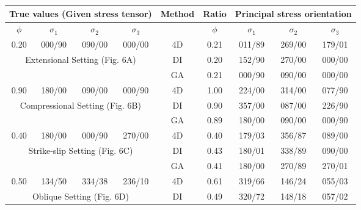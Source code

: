 \pagebreak
\begin{table}[H]
  \footnotesize
  \centering
  \renewcommand{\arraystretch}{1.5}
  \begin{tabular}{@{}ccccccccc@{}}
    \toprule
    \multicolumn{4}{c}{True values (Given stress tensor)} & Method & Ratio & \multicolumn{3}{c}{Principal stress orientation} \\
    
    \midrule
    
    $\phi$ & $\sigma_1$ & $\sigma_2$ & $\sigma_3$ & & $\phi$ & $\sigma_1$ & $\sigma_2$ & $\sigma_3$ \\
    
    \cmidrule(lr){1-4} \cmidrule(lr){6-9}
  
    0.20 & 000/90 & 090/00 & 000/00 & 4D & 0.21 & 011/89 & 269/00 & 179/01 \\
    
    \multicolumn{4}{c}{Extensional Setting (Fig. 6A)} & DI & 0.20 & 152/90 & 270/00 & 000/00 \\
    
    \multicolumn{4}{c}{ } & GA & 0.21 & 000/90 & 090/00 & 000/00 \\
    \midrule
    
    0.90 & 180/00 & 090/00 & 000/90 & 4D & 1.00 & 224/00 & 314/00 & 077/90 \\
    
    \multicolumn{4}{c}{ Compressional Setting (Fig. 6B)} & DI & 0.90 & 357/00 & 087/00 & 226/90 \\
     
    \multicolumn{4}{c}{ } & GA & 0.89 & 180/00 & 090/00 & 000/90 \\
    \midrule
    
    0.40 & 180/00 & 000/90 & 270/00 & 4D & 0.40 & 179/03 & 356/87 & 089/00 \\
    
    \multicolumn{4}{c}{ Strike-slip Setting (Fig. 6C)} & DI & 0.43 & 180/01 & 338/89 & 090/00 \\
     
    \multicolumn{4}{c}{ } & GA & 0.41 & 180/00 & 270/89 & 270/01 \\
    \midrule

     0.50 & 134/50 & 334/38 & 236/10 & 4D & 0.61 & 319/66 & 146/24 & 055/03 \\
    
    \multicolumn{4}{c}{ Oblique Setting (Fig. 6D)} & DI & 0.49 & 320/72 & 148/18 & 057/02 \\
     

\end{tabular}
\end{table}
